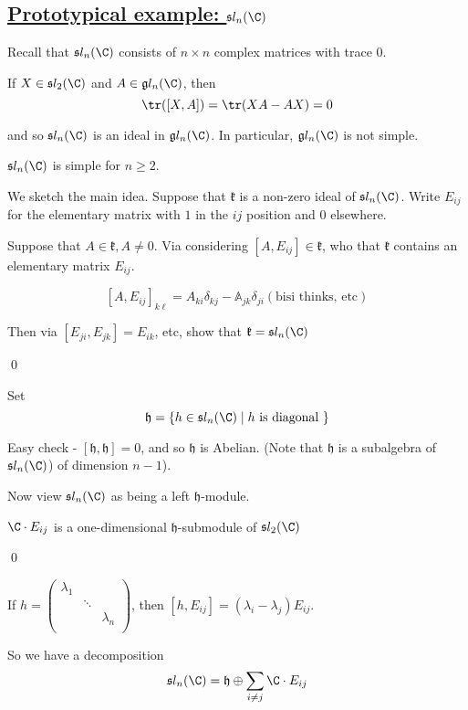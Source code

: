 \documentclass[x11names,reqno,14pt]{extarticle}
\newcommand{\A}{\mathbb{A}}
\newcommand{\mk}[1]{\mathfrak{#1}}
\newcommand{\g}{\mk{g}}
\newcommand{\h}{\mk{h}}
\begin{document}
\subsection*{\underline{Prototypical example: $\mk{s}l_n(\C)$}}

Recall that $\mk{s}l_n(\C)$ consists of $n\times n$ complex matrices with trace 0. 

If $X \in \mk{s}l_2(\C)$ and $A \in \g l_n(\C)$, then
\[
\tr([X,A]) = \tr(XA - AX) = 0
\]

and so $\mk{s}l_n(\C)$ is an ideal in $\g l_n(\C)$. In particular, $\g l_n(\C)$ is not simple. 

\prop

$\mk{s} l_n(\C)$ is simple for $n\geq2$.

\proof

We sketch the main idea. Suppose that $\mk{k}$ is a non-zero ideal of $\mk{s}l_n(\C)$. Write $E_{ij}$ for the elementary matrix with $1$ in the $ij$ position and 0 elsewhere.

Suppose that $A\in\mk{k}, A\neq0$. Via considering $[A,E_{ij}]\in\mk{k}$, who that $\mk{k}$ contains an elementary matrix $E_{ij}$.

\[
[A,E_{ij}]_{k\ell} = A_{ki}\delta_{kj} - \A_{jk}\delta_{ji} (\text{bisi thinks, etc})
\]

Then via $[E_{ji},E_{jk}] = E_{ik}$, etc, show that $\mk{k} = \mk{s}l_n(\C)$

\qed

Set
\[
\h = \{h \in \mk{s}l_n(\C) \mid h\text{ is diagonal }\}
\]

Easy check - $[\h, \h] = 0$, and so $\h$ is Abelian. (Note that $\h$ is a subalgebra of $\mk{s}l_n(\C)$) of dimension $n - 1$).

Now view $\mk{s}l_n(\C)$ as being a left $\h$-module. 

\claim

$\C\cdot E_{ij}$ is a one-dimensional $\h$-submodule of $\mk{s}l_2(\C)$

\proof

\qed

If $h = \begin{pmatrix} \lambda_1 & & \\ & \ddots & \\ & & \lambda_n \\\end{pmatrix}$, then $[h, E_{ij}] = (\lambda_i-\lambda_j)E_{ij}$. 

So we have a decomposition 
\[
\mk{s}l_n(\C) = \h \oplus \sum_{i\neq j}\C\cdot E_{ij}
\]
\end{document}
